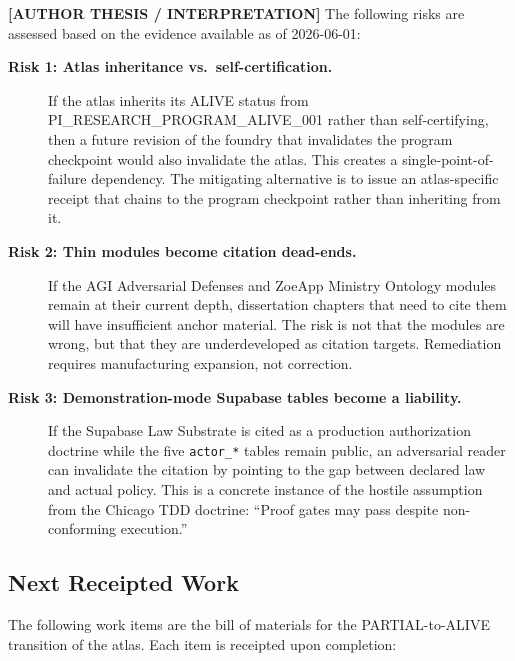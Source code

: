 \textbf{[AUTHOR THESIS / INTERPRETATION]} The following risks are assessed based
on the evidence available as of 2026-06-01:

\begin{description}
  \item[\textbf{Risk 1: Atlas inheritance vs.\ self-certification.}] If the
        atlas inherits its ALIVE status from PI\_RESEARCH\_PROGRAM\_ALIVE\_001
        rather than self-certifying, then a future revision of the foundry that
        invalidates the program checkpoint would also invalidate the atlas. This
        creates a single-point-of-failure dependency. The mitigating alternative
        is to issue an atlas-specific receipt that chains to the program
        checkpoint rather than inheriting from it.

  \item[\textbf{Risk 2: Thin modules become citation dead-ends.}] If the AGI
        Adversarial Defenses and ZoeApp Ministry Ontology modules remain at their
        current depth, dissertation chapters that need to cite them will have
        insufficient anchor material. The risk is not that the modules are wrong,
        but that they are underdeveloped as citation targets. Remediation requires
        manufacturing expansion, not correction.

  \item[\textbf{Risk 3: Demonstration-mode Supabase tables become a liability.}]
        If the Supabase Law Substrate is cited as a production authorization
        doctrine while the five \texttt{actor\_*} tables remain public, an
        adversarial reader can invalidate the citation by pointing to the gap
        between declared law and actual policy. This is a concrete instance of
        the hostile assumption from the Chicago TDD doctrine: ``Proof gates may
        pass despite non-conforming execution.''
\end{description}

\subsection{Next Receipted Work}
\label{sec:atlas-open-next}

The following work items are the bill of materials for the PARTIAL-to-ALIVE
transition of the atlas. Each item is receipted upon completion:

